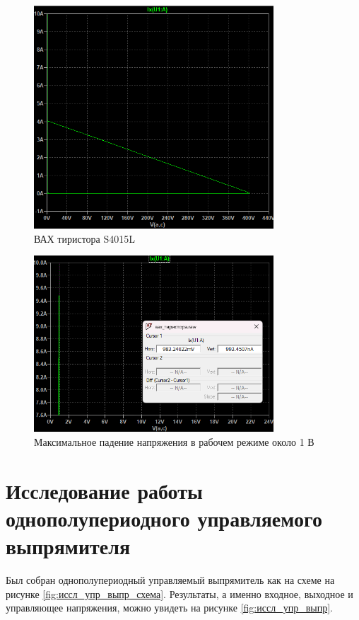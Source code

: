 \begin{figure}[H]
    \centering
    \includegraphics[width=0.8\textwidth]{figs/вах.png}
    \caption{ВАХ тиристора S4015L}
    \label{fig:вах}
\end{figure}

\begin{figure}[H]
    \centering
    \includegraphics[width=0.8\textwidth]{figs/макс_пад_напр_в_раб_режиме.png}
    \caption{Максимальное падение напряжения в рабочем режиме около 1 В}
    \label{fig:макс_пад_напр_в_раб_режиме}
\end{figure}

\section*{Исследование работы однополупериодного управляемого
выпрямителя}

Был собран однополупериодный управляемый выпрямитель как на схеме на рисунке
\ref{fig:иссл_упр_выпр_схема}. Результаты, а именно входное, выходное
и управляющее напряжения, можно увидеть на рисунке \ref{fig:иссл_упр_выпр}.

